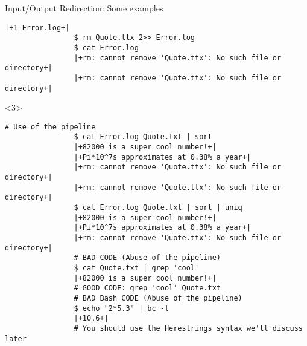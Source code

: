 \begin{frame}[fragile]{Input/Output Redirection: Some examples}
\begin{overlayarea}{\textwidth}{0.7\textheight}
\begin{onlyenv}
\begin{lstlisting}[style=MyBash, aboveskip=2mm, firstnumber=19]
                |+1 Error.log+|
                $ rm Quote.ttx 2>> Error.log
                $ cat Error.log
                |+rm: cannot remove 'Quote.ttx': No such file or directory+|
                |+rm: cannot remove 'Quote.ttx': No such file or directory+|
            \end{lstlisting}
        \end{onlyenv}
        \begin{onlyenv}<3>
            \begin{lstlisting}[style=MyBash, aboveskip=2mm, firstnumber=37]
                # Use of the pipeline
                $ cat Error.log Quote.txt | sort
                |+82000 is a super cool number!+|
                |+Pi*10^7s approximates at 0.38% a year+|
                |+rm: cannot remove 'Quote.ttx': No such file or directory+|
                |+rm: cannot remove 'Quote.ttx': No such file or directory+|
                $ cat Error.log Quote.txt | sort | uniq
                |+82000 is a super cool number!+|
                |+Pi*10^7s approximates at 0.38% a year+|
                |+rm: cannot remove 'Quote.ttx': No such file or directory+|
                # BAD CODE (Abuse of the pipeline)
                $ cat Quote.txt | grep 'cool'
                |+82000 is a super cool number!+|
                # GOOD CODE: grep 'cool' Quote.txt
                # BAD Bash CODE (Abuse of the pipeline)
                $ echo "2*5.3" | bc -l
                |+10.6+|
                # You should use the Herestrings syntax we'll discuss later
            \end{lstlisting}
        \end{onlyenv}
    \end{overlayarea}
\end{frame}
